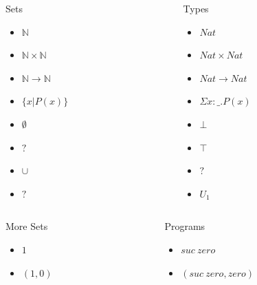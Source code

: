 \documentclass[10pt]{beamer}
\begin{document}
\begin{frame}
\begin{columns}
  
\begin{column}{0.4 \textwidth}
\begin{exampleblock}{Sets}
  \begin{itemize}
    \item $\mathbb{N}$
    \item $\mathbb{N} \times \mathbb{N}$
    \item $\mathbb{N} \to \mathbb{N}$
    \item $\{x|P(x)\}$
    \item $\emptyset$
    \item $?$
    \item $\cup$
    \item $?$
  \end{itemize}
\end{exampleblock}
\end{column}

\begin{column}{0.4 \textwidth}
\begin{block}{Types}
  \begin{itemize}
    \item $Nat$
    \item $Nat \times Nat$
    \item $Nat \to Nat$
    \item $\Sigma x : \_ . P(x)$
    \item $\bot$
    \item $\top$
    \item $?$
    \item $U_1$
  \end{itemize}
\end{block}
\end{column}
\end{columns}

\begin{columns}
  
\begin{column}{0.4 \textwidth}
\begin{exampleblock}{More Sets}
  \begin{itemize}
    \item $1$
    \item $(1,0)$
  \end{itemize}
\end{exampleblock}
\end{column}

\begin{column}{0.4 \textwidth}
\begin{block}{Programs}
  \begin{itemize}
    \item $suc\ zero$
    \item $(suc\ zero, zero)$
  \end{itemize}
\end{block}
\end{column}
\end{columns}

\end{frame}
\end{document}
